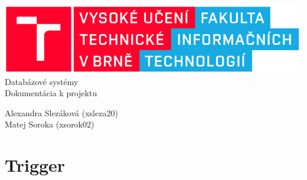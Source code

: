 \documentclass[a4paper,12pt,oneside]{article}
\begin{document}
\begin{titlepage}
  \begin{center}
	\includegraphics[origin=c,scale=0.5]{fit}
	\\[6cm]
    {\Huge Databázové systémy}\\[5mm]
    {\LARGE Dokumentácia k projektu}\\
    \begin{flushleft}
      \Large{Alexandra Slezáková (xsleza20)\\Matej Soroka (xsorok02)}
    \end{flushleft}
  \end{center}
\end{titlepage}

\tableofcontents
\newpage

\section{Trigger}
\end{document}
